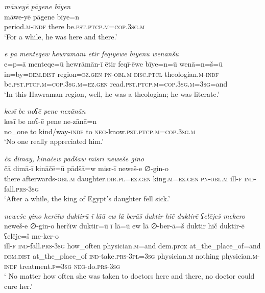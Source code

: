 \ea \label{ZP.22}
\textit{māweyē pāgene bīyen} \\ 
\gll māwe-yē pāgene bīye=n \\ 
 period\textsc{.m}\textsc{-indf} there be\textsc{.pst}\textsc{.ptcp}\textsc{.m}\textsc{=cop}\textsc{.3sg}\textsc{.m} \\ 
\glt `For a while, he was here and there.'
\z 
 
\ea \label{ZP.23}
\textit{e pā menteqew hewrāmānī ētir feqīyēwe bīyenū wenānšū} \\ 
\gll e=p=ā menteqe=ū hewrāmān-ī ētir feqī-ēwe bīye=n=ū wenā=n=š=ū \\ 
 in=by=\textsc{dem.dist} region\textsc{\textsc{=ez.gen}} \textsc{pn}\textsc{-obl}\textsc{.m} \textsc{disc.ptcl} theologian\textsc{.m}\textsc{-indf} be\textsc{.pst}\textsc{.ptcp}\textsc{.m}\textsc{=cop}\textsc{.3sg}\textsc{.m}\textsc{\textsc{=ez.gen}} read\textsc{.pst}\textsc{.ptcp}\textsc{.m}\textsc{=cop}\textsc{.3sg}\textsc{.m}\textsc{=3sg}=and \\ 
\glt `In this Hawraman region, well, he was a theologian; he was literate.'
\z 
 
\ea \label{ZP.24}
\textit{kesī be noʕē pene nezānān} \\ 
\gll kesī be noʕ-ē pene ne-zānā=n \\ 
 no\_one to kind/way\textsc{-indf} to \textsc{neg-}know\textsc{.pst}\textsc{.ptcp}\textsc{.m}\textsc{=cop}\textsc{.3sg}\textsc{.m} \\ 
\glt `No one really appreciated him.'
\z 
 
\ea \label{ZP.25}
\textit{čā dimāy, kināčēw pādšāw misrī neweše gino} \\ 
\gll čā dimā-ī kināčē=ū pādšā=w misr-ī neweš-e ∅-gin-o \\ 
 there afterwards\textsc{-obl}\textsc{.m} daughter\textsc{.dir}\textsc{.pl}\textsc{\textsc{=ez.gen}} king\textsc{.m}\textsc{\textsc{=ez.gen}} \textsc{pn}\textsc{-obl}\textsc{.m} ill\textsc{-f} \textsc{ind-}fall\textsc{.prs}\textsc{-3sg} \\ 
\glt `After a while, the king of Egypt’s daughter fell sick.'
\z 
 
\ea \label{ZP.26}
\textit{neweše gino herčīw duktirū ī lāū ew lā berāš duktir hīč duktirē ʕelēješ mekero} \\ 
\gll neweš-e ∅-gin-o herčīw duktir=ū ī lā=ū ew lā ∅-ber-ā=š duktir hīč duktir-ē ʕelēje=š me-ker-o \\ 
 ill\textsc{-f} \textsc{ind-}fall\textsc{.prs}\textsc{-3sg} how\_often physician\textsc{.m}=and dem.prox at\_the\_place\_of=and \textsc{dem.dist} at\_the\_place\_of \textsc{ind-}take\textsc{.prs}\textsc{-3pl}\textsc{=3sg} physician\textsc{.m} nothing physician\textsc{.m}\textsc{-indf} treatment\textsc{.f}\textsc{=3sg} \textsc{neg-}do\textsc{.prs}\textsc{-3sg} \\ 
\glt ` No matter how often she was taken to doctors here and there, no doctor could cure her.'
\z 
 
